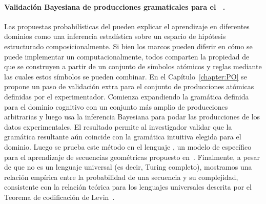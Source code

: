 \paragraph{Validación Bayesiana de producciones gramaticales para el \lot~\cite{romano2018bayesian}.} 
Las propuestas probabilísticas del \lot pueden explicar el aprendizaje en diferentes dominios como una inferencia estadística sobre un espacio de hipótesis estructurado composicionalmente. Si bien los marcos pueden diferir en cómo se puede implementar un \lot computacionalmente, todos comparten la propiedad de que se construyen a partir de un conjunto de símbolos atómicos y reglas mediante las cuales estos símbolos se pueden combinar. En el Capítulo~\ref{chapter:PO} se propone un paso de validación extra para el conjunto de producciones atómicas definidas por el experimentador. Comienza expandiendo la gramática \lot definida para el dominio cognitivo con un conjunto más amplio de producciones arbitrarias y luego usa la inferencia Bayesiana para podar las producciones de los datos experimentales. El resultado permite al investigador validar que la gramática resultante aún coincide con la gramática intuitiva elegida para el dominio. Luego se prueba este método en el lenguaje \gramgeo, un modelo de \lot específico para el aprendizaje de secuencias geométricas propuesto en~\cite{amalric2017language}. Finalmente, a pesar de que \gramgeo no es un lenguaje universal (es decir, Turing completo), mostramos una relación empírica entre la probabilidad de una secuencia y su complejidad, consistente con la relación teórica para los lenguajes universales descrita por el Teorema de codificación de Levin~\cite{levin1974laws}.


